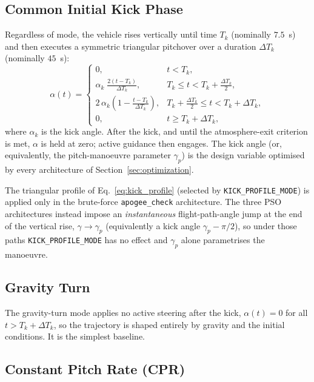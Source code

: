 \subsection{Common Initial Kick Phase}
\label{ssec:kick_phase}

Regardless of mode, the vehicle rises vertically until time $T_k$ (nominally
$7.5$~s) and then executes a symmetric triangular pitchover over a duration
$\Delta T_k$ (nominally $45$~s):
\begin{equation}
  \alpha(t) =
  \begin{cases}
    0, & t < T_k, \\[2pt]
    \displaystyle\alpha_k\;\frac{2(t - T_k)}{\Delta T_k},
      & T_k \le t < T_k + \tfrac{\Delta T_k}{2}, \\[6pt]
    \displaystyle 2\, \alpha_k\!\left(1 - \frac{t - T_k}{\Delta T_k}\right),
      & T_k + \tfrac{\Delta T_k}{2} \le t < T_k + \Delta T_k, \\[6pt]
    0, & t \ge T_k + \Delta T_k,
  \end{cases}
  \label{eq:kick_profile}
\end{equation}
where $\alpha_k$ is the kick angle. After the kick, and until the atmosphere-exit
criterion is met, $\alpha$ is held at zero; active guidance then engages. The
kick angle (or, equivalently, the pitch-manoeuvre parameter $\gamma_p$) is the
design variable optimised by every architecture of Section~\ref{sec:optimization}.

The triangular profile of Eq.~\eqref{eq:kick_profile} (selected by
\texttt{KICK\_PROFILE\_MODE}) is applied only in the brute-force
\texttt{apogee\_check} architecture. The three PSO architectures instead impose an
\emph{instantaneous} flight-path-angle jump at the end of the vertical rise,
$\gamma \to \gamma_p$ (equivalently a kick angle $\gamma_p-\pi/2$), so under those
paths \texttt{KICK\_PROFILE\_MODE} has no effect and $\gamma_p$ alone parametrises
the manoeuvre.

\subsection{Gravity Turn}
\label{ssec:gt}

The gravity-turn mode applies no active steering after the kick,
$\alpha(t)=0$ for all $t>T_k+\Delta T_k$, so the trajectory is shaped entirely by
gravity and the initial conditions. It is the simplest baseline.

\subsection{Constant Pitch Rate (CPR)}
\label{ssec:cpr}

